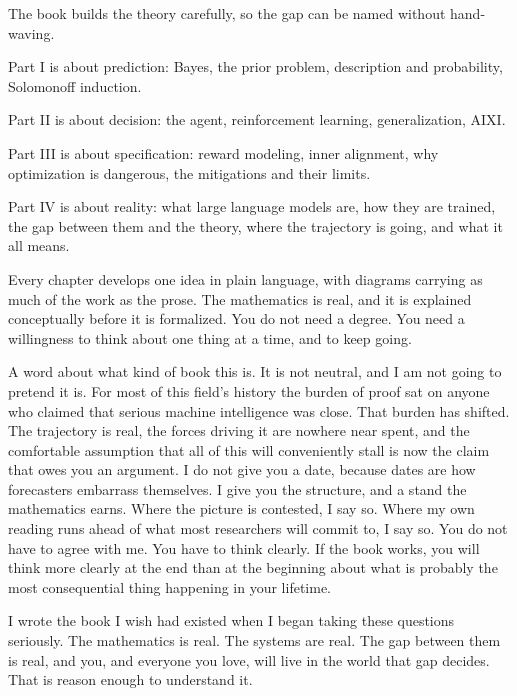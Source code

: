 The book builds the theory carefully, so the gap can be named without hand-waving.

Part I is about prediction: Bayes, the prior problem, description and probability, Solomonoff induction.

Part II is about decision: the agent, reinforcement learning, generalization, AIXI.

Part III is about specification: reward modeling, inner alignment, why optimization is dangerous, the mitigations and their limits.

Part IV is about reality: what large language models are, how they are trained, the gap between them and the theory, where the trajectory is going, and what it all means.

Every chapter develops one idea in plain language, with diagrams carrying as much of the work as the prose. The mathematics is real, and it is explained conceptually before it is formalized. You do not need a degree. You need a willingness to think about one thing at a time, and to keep going.

\medskip

\noindent A word about what kind of book this is. It is not neutral, and I am not going to pretend it is. For most of this field's history the burden of proof sat on anyone who claimed that serious machine intelligence was close. That burden has shifted. The trajectory is real, the forces driving it are nowhere near spent, and the comfortable assumption that all of this will conveniently stall is now the claim that owes you an argument. I do not give you a date, because dates are how forecasters embarrass themselves. I give you the structure, and a stand the mathematics earns. Where the picture is contested, I say so. Where my own reading runs ahead of what most researchers will commit to, I say so. You do not have to agree with me. You have to think clearly. If the book works, you will think more clearly at the end than at the beginning about what is probably the most consequential thing happening in your lifetime.

\medskip

\noindent I wrote the book I wish had existed when I began taking these questions seriously. The mathematics is real. The systems are real. The gap between them is real, and you, and everyone you love, will live in the world that gap decides. That is reason enough to understand it.
